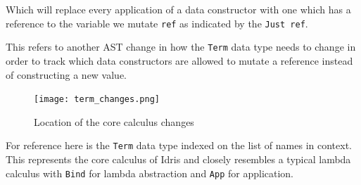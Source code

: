 \documentclass[
]{article}
\newenvironment{Shaded}{}{}
\newcommand{\CommentTok}[1]{\textcolor[rgb]{0.38,0.63,0.69}{\textit{#1}}}
\newcommand{\DataTypeTok}[1]{\textcolor[rgb]{0.56,0.13,0.00}{#1}}
\newcommand{\FunctionTok}[1]{\textcolor[rgb]{0.02,0.16,0.49}{#1}}
\newcommand{\KeywordTok}[1]{\textcolor[rgb]{0.00,0.44,0.13}{\textbf{#1}}}
\newcommand{\NormalTok}[1]{#1}
\newcommand{\OperatorTok}[1]{\textcolor[rgb]{0.40,0.40,0.40}{#1}}
\newcommand{\OtherTok}[1]{\textcolor[rgb]{0.00,0.44,0.13}{#1}}
\begin{document}
\begin{Shaded}
\end{Shaded}

Which will replace every application of a data constructor with one
which has a reference to the variable we mutate \texttt{ref} as
indicated by the \texttt{Just\ ref}.

This refers to another AST change in how the \texttt{Term} data type
needs to change in order to track which data constructors are allowed to
mutate a reference instead of constructing a new value.

\begin{figure}
\centering
\texttt{[image: term\_changes.png]}
\caption{Location of the core calculus changes}
\end{figure}

For reference here is the \texttt{Term} data type indexed on the list of
names in context. This represents the core calculus of Idris and closely
resembles a typical lambda calculus with \texttt{Bind} for lambda
abstraction and \texttt{App} for application.
\end{document}
